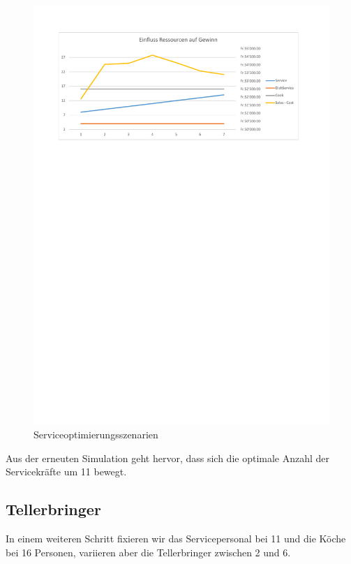 \documentclass[ngerman,a4paper,12pt]{scrreprt}
\begin{document}
				\begin{figure}[H]
					\centering
						\includegraphics[trim=2cm 22.75cm 2.5cm 2cm, clip=true,width=\textwidth]{../Auswertung/2_Service.pdf}
						\caption[Serviceoptimierungsszenarien]{Serviceoptimierungsszenarien}
						\label{Serviceoptimierungsszenarien}
				\end{figure}
				
				Aus der erneuten Simulation geht hervor, dass sich die optimale Anzahl der Servicekräfte um 11 bewegt.
				
			\subsection{Tellerbringer}
				In einem weiteren Schritt fixieren wir das Servicepersonal bei 11 und die Köche bei 16 Personen, variieren aber die Tellerbringer zwischen 2 und 6.
				
\end{document}
